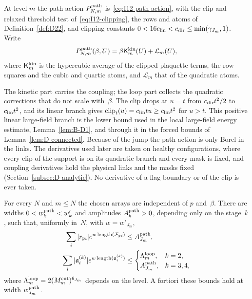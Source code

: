 \begin{definition}\label{def:D23}
At level $m$ the path action $P^{\mathrm{path}}_{N,m}$ is~\eqref{eq:I12-path-action}, with the clip and relaxed threshold test of~\eqref{eq:I12-clipping}, the rows and atoms of Definition~\ref{def:D22}, and clipping constants $0<16c_{\rm lin}<c_{\rm dir}\le\min(\gamma_{J_m},1)$. Write
\begin{equation*}
P^{\mathrm{path}}_{N,m}(\beta,U)=\beta\mathsf K^{\rm kin}_m(U)+\mathcal L_m(U),
\end{equation*}
where $\mathsf K^{\rm kin}_m$ is the hypercubic average of the clipped plaquette terms, the row squares and the cubic and quartic atoms, and $\mathcal L_m$ that of the quadratic atoms.
\end{definition}

The kinetic part carries the coupling; the loop part collects the quadratic corrections that do not scale with~$\beta$. The clip drops at $u=t$ from $c_{\rm dir}t^2/2$ to $c_{\rm lin}t^2$, and its linear branch gives $\operatorname{clip}_t(u)=c_{\rm lin}tu\ge c_{\rm lin}t^2$ for $u>t$. This positive linear large-field branch is the lower bound used in the local large-field energy estimate, Lemma~\ref{lem:B-D1}, and through it in the forced bounds of Lemma~\ref{lem:D-connected}. Because of the jump the path action is only Borel in the links. The derivatives used later are taken on healthy configurations, where every clip of the support is on its quadratic branch and every mask is fixed, and coupling derivatives hold the physical links and the masks fixed (Section~\ref{subsec:D-analytic}). No derivative of a flag boundary or of the clip is ever taken.

\begin{lemma}\label{lem:C1}
For every $N$ and $m\le N$ the chosen arrays are independent of $p$ and~$\beta$. There are widths $0<w^{\rm path}_k<w'_k$ and amplitudes $A^{\rm path}_k>0$, depending only on the stage~$k$, such that, uniformly in~$N$, with $w=w'_{J_m}$,
\begin{align*}
\sum_i|r_{\mathfrak p i}|e^{w\operatorname{length}(\mathcal F_{\mathfrak p i})}&\le A_{J_m}^{\rm path},\\
\sum_i|\mathfrak a_i^{(k)}|e^{w\operatorname{length}(\mathfrak a_i^{(k)})}
&\le\begin{cases}\Lambda_m^{\rm loop},&k=2,\\A_{J_m}^{\rm path},&k=3,4,\end{cases}
\end{align*}
where $\Lambda_m^{\rm loop}=2(M^{\mathrm{cut}}_m)^{\theta_{J_m}}$ depends on the level. A fortiori these bounds hold at width $w^{\rm path}_{J_m}$.
\end{lemma}

